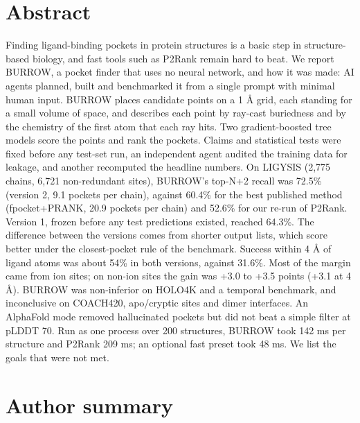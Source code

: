 \documentclass[10pt,letterpaper]{article}
\begin{document}
\section*{Abstract}

Finding ligand-binding pockets in protein structures is a basic step in structure-based biology, and fast tools such as P2Rank remain hard to beat. We report BURROW, a pocket finder that uses no neural network, and how it was made: AI agents planned, built and benchmarked it from a single prompt with minimal human input. BURROW places candidate points on a 1 \AA{} grid, each standing for a small volume of space, and describes each point by ray-cast buriedness and by the chemistry of the first atom that each ray hits. Two gradient-boosted tree models score the points and rank the pockets. Claims and statistical tests were fixed before any test-set run, an independent agent audited the training data for leakage, and another recomputed the headline numbers. On LIGYSIS (2,775 chains, 6,721 non-redundant sites), BURROW's top-N+2 recall was 72.5\% (version 2, 9.1 pockets per chain), against 60.4\% for the best published method (fpocket+PRANK, 20.9 pockets per chain) and 52.6\% for our re-run of P2Rank. Version 1, frozen before any test predictions existed, reached 64.3\%. The difference between the versions comes from shorter output lists, which score better under the closest-pocket rule of the benchmark. Success within 4 \AA{} of ligand atoms was about 54\% in both versions, against 31.6\%. Most of the margin came from ion sites; on non-ion sites the gain was +3.0 to +3.5 points (+3.1 at 4 \AA{}). BURROW was non-inferior on HOLO4K and a temporal benchmark, and inconclusive on COACH420, apo/cryptic sites and dimer interfaces. An AlphaFold mode removed hallucinated pockets but did not beat a simple filter at pLDDT 70. Run as one process over 200 structures, BURROW took 142 ms per structure and P2Rank 209 ms; an optional fast preset took 48 ms. We list the goals that were not met.

\section*{Author summary}
\end{document}
